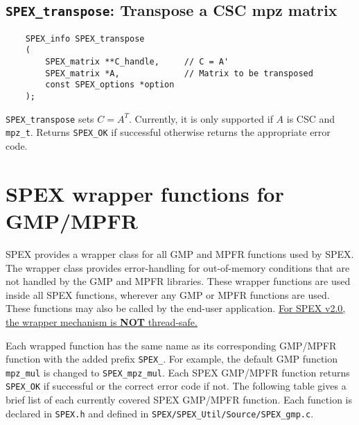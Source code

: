 \documentclass[12pt]{report}
\theoremstyle{definition}
\begin{document}
\subsection{\texttt{SPEX\_transpose}: Transpose a CSC mpz matrix}

\begin{mdframed}[userdefinedwidth=6in]
{\footnotesize
\begin{verbatim}
    SPEX_info SPEX_transpose
    (
        SPEX_matrix **C_handle,     // C = A'
        SPEX_matrix *A,             // Matrix to be transposed
        const SPEX_options *option
    ); 
\end{verbatim}
} \end{mdframed}

\verb|SPEX_transpose| sets $C = A^T$. Currently, it is only supported if $A$ is CSC and \verb|mpz_t|. Returns \verb|SPEX_OK| if successful otherwise returns the appropriate error code.

\section{SPEX wrapper functions for GMP/MPFR}

SPEX provides a wrapper class for all GMP and MPFR functions used by SPEX.
The wrapper class provides error-handling for out-of-memory conditions
that are not handled by the GMP and MPFR libraries.  These wrapper functions
are used inside all SPEX functions, wherever any GMP or MPFR functions are
used.  These functions may also be called by the end-user application. 
\ul{For SPEX v2.0, the wrapper mechanism is {\bf NOT} thread-safe.} 

Each wrapped function has the same name as its corresponding GMP/MPFR function
with the added prefix \verb|SPEX_|. For example, the default GMP function
\verb|mpz_mul| is changed to \verb|SPEX_mpz_mul|. Each SPEX GMP/MPFR function
returns \verb|SPEX_OK| if successful or the correct error code if not. The
following table gives a brief list of each currently covered SPEX GMP/MPFR
function. Each function is declared in \verb|SPEX.h| and defined in
\verb|SPEX/SPEX_Util/Source/SPEX_gmp.c|.
\end{document}
